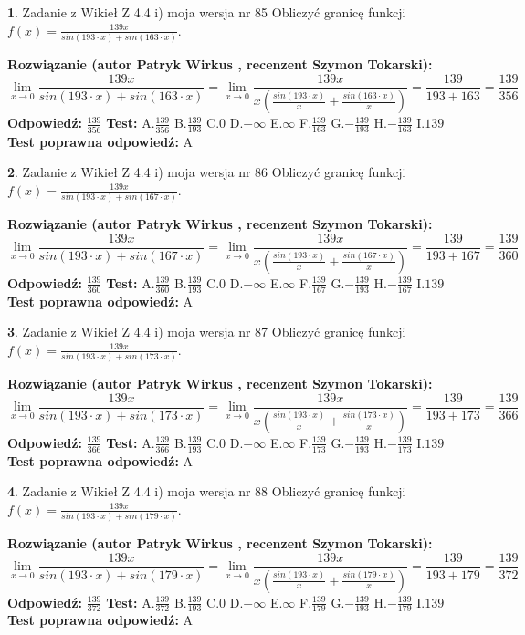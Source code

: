 \documentclass[12pt, a4paper]{article}
\theoremstyle{definition} %
\newtheorem{zad}{}
\newcommand{\zadStart}[1]{\begin{zad}#1\newline}
\newcommand{\zadStop}{\end{zad}}
\newcommand{\rozwStart}[2]{\noindent \textbf{Rozwiązanie (autor #1 , recenzent #2): }\newline}
\newcommand{\rozwStop}{\newline}
\newcommand{\odpStart}{\noindent \textbf{Odpowiedź:}\newline}
\newcommand{\odpStop}{\newline}
\newcommand{\testStart}{\noindent \textbf{Test:}\newline}
\newcommand{\testStop}{\newline}
\newcommand{\kluczStart}{\noindent \textbf{Test poprawna odpowiedź:}\newline}
\newcommand{\kluczStop}{\newline}
\begin{document}
\zadStart{Zadanie z Wikieł Z 4.4 i) moja wersja nr 85}
Obliczyć granicę funkcji $f(x)=\frac{139x}{sin(193\cdot x) +sin(163\cdot x)}$.
\zadStop
\rozwStart{Patryk Wirkus}{Szymon Tokarski}
$$\lim\limits_{x\to 0}\frac{139x}{sin(193\cdot x) +sin(163\cdot x)}=\lim\limits_{x\to 0}\frac{139x}{x(\frac{sin(193\cdot x)}{x}+\frac{sin(163\cdot x)}{x})}=\frac{139}{193+163} = \frac{139}{356}$$
\rozwStop
\odpStart
$\frac{139}{356}$
\odpStop
\testStart
A.$\frac{139}{356}$
B.$\frac{139}{193}$
C.$0$
D.$-\infty$
E.$\infty$
F.$\frac{139}{163}$
G.$-\frac{139}{193}$
H.$-\frac{139}{163}$
I.$139$
\testStop
\kluczStart
A
\kluczStop



\zadStart{Zadanie z Wikieł Z 4.4 i) moja wersja nr 86}
Obliczyć granicę funkcji $f(x)=\frac{139x}{sin(193\cdot x) +sin(167\cdot x)}$.
\zadStop
\rozwStart{Patryk Wirkus}{Szymon Tokarski}
$$\lim\limits_{x\to 0}\frac{139x}{sin(193\cdot x) +sin(167\cdot x)}=\lim\limits_{x\to 0}\frac{139x}{x(\frac{sin(193\cdot x)}{x}+\frac{sin(167\cdot x)}{x})}=\frac{139}{193+167} = \frac{139}{360}$$
\rozwStop
\odpStart
$\frac{139}{360}$
\odpStop
\testStart
A.$\frac{139}{360}$
B.$\frac{139}{193}$
C.$0$
D.$-\infty$
E.$\infty$
F.$\frac{139}{167}$
G.$-\frac{139}{193}$
H.$-\frac{139}{167}$
I.$139$
\testStop
\kluczStart
A
\kluczStop



\zadStart{Zadanie z Wikieł Z 4.4 i) moja wersja nr 87}
Obliczyć granicę funkcji $f(x)=\frac{139x}{sin(193\cdot x) +sin(173\cdot x)}$.
\zadStop
\rozwStart{Patryk Wirkus}{Szymon Tokarski}
$$\lim\limits_{x\to 0}\frac{139x}{sin(193\cdot x) +sin(173\cdot x)}=\lim\limits_{x\to 0}\frac{139x}{x(\frac{sin(193\cdot x)}{x}+\frac{sin(173\cdot x)}{x})}=\frac{139}{193+173} = \frac{139}{366}$$
\rozwStop
\odpStart
$\frac{139}{366}$
\odpStop
\testStart
A.$\frac{139}{366}$
B.$\frac{139}{193}$
C.$0$
D.$-\infty$
E.$\infty$
F.$\frac{139}{173}$
G.$-\frac{139}{193}$
H.$-\frac{139}{173}$
I.$139$
\testStop
\kluczStart
A
\kluczStop



\zadStart{Zadanie z Wikieł Z 4.4 i) moja wersja nr 88}
Obliczyć granicę funkcji $f(x)=\frac{139x}{sin(193\cdot x) +sin(179\cdot x)}$.
\zadStop
\rozwStart{Patryk Wirkus}{Szymon Tokarski}
$$\lim\limits_{x\to 0}\frac{139x}{sin(193\cdot x) +sin(179\cdot x)}=\lim\limits_{x\to 0}\frac{139x}{x(\frac{sin(193\cdot x)}{x}+\frac{sin(179\cdot x)}{x})}=\frac{139}{193+179} = \frac{139}{372}$$
\rozwStop
\odpStart
$\frac{139}{372}$
\odpStop
\testStart
A.$\frac{139}{372}$
B.$\frac{139}{193}$
C.$0$
D.$-\infty$
E.$\infty$
F.$\frac{139}{179}$
G.$-\frac{139}{193}$
H.$-\frac{139}{179}$
I.$139$
\testStop
\kluczStart
A
\kluczStop
\end{document}
